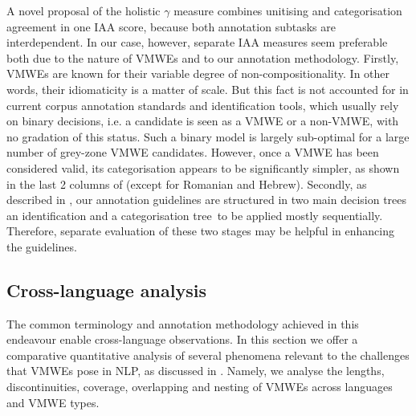 \documentclass[output=paper,
modfonts,
]{langscibook}
\begin{document}
A novel proposal of the holistic $\gamma$ measure \citep{DBLP:journals/coling/MathetWM15}  combines unitising and categorisation agreement in one IAA score, because both annotation subtasks are interdependent. In our case, however, separate IAA measures seem preferable both due to the nature of VMWEs and to our annotation methodology. Firstly, VMWEs are known for their variable degree of non-compositionality. In other words, their idiomaticity is a matter of scale. But this fact is not accounted for in current corpus annotation standards and identification tools, which usually rely on binary decisions, i.e. a candidate is seen as a VMWE or a non-VMWE, with no gradation of this status. Such a binary model is largely sub-optimal for a large number of grey-zone VMWE candidates. 
However, once a VMWE has been considered valid,  its categorisation appears to be significantly simpler, as shown in the last 2 columns of  (except for Romanian and Hebrew). Secondly, as described in  \textendash  {}, our annotation guidelines are structured in two main decision trees \textendash an identification and a categorisation tree\textendash  ~to be applied mostly sequentially. %
Therefore, separate evaluation of these two stages may be helpful in enhancing the guidelines.


\subsection{Cross-language analysis}
\label{sec:analysis}
%

The common terminology and annotation methodology achieved in this endeavour enable cross-language observations. In this section we offer a comparative quantitative analysis of several phenomena relevant to the challenges that VMWEs pose in NLP, as discussed in . Namely, we analyse the lengths, discontinuities, coverage, overlapping and nesting of VMWEs across languages and VMWE types.
\end{document}
